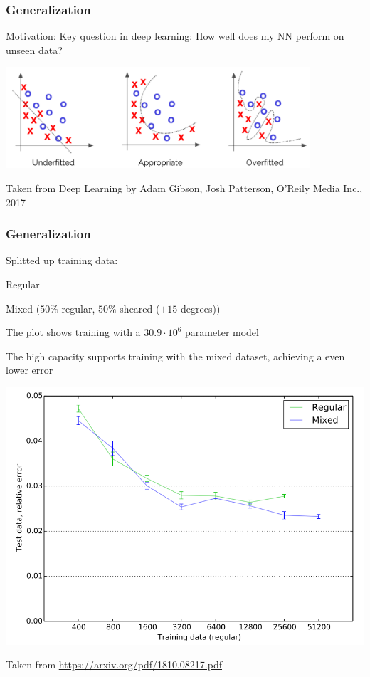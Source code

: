 \begin{frame}
    \frametitle{Generalization}
    \vspace*{0.8cm}
Motivation: Key question in deep learning: How well does my NN perform on unseen data?


\includegraphics[width=0.85\textwidth, height=.5\textheight]{./Ressourcen/Praesentation/Bilder/generalization.png}%

\vspace*{-0.6cm}

Taken from Deep Learning by Adam Gibson, Josh Patterson, O'Reily Media Inc., 2017

\end{frame}
\clearpage

\begin{frame}
    \frametitle{Generalization}
    \vspace*{0.8cm}
\begin{multicols}{2}
    Splitted up training data:
    \begin{PraesentationAufzaehlung}
		\item Regular
		\item Mixed ($50\%$ regular, $50\%$ sheared ($\pm 15$ degrees))
	\end{PraesentationAufzaehlung}
	
	The plot shows training with a $30.9 \cdot 10^6$ parameter model
	
	The high capacity supports training with the mixed dataset, \newline
	achieving a even lower error
	
	 
	
    \vfill\columnbreak
	\includegraphics[width=\columnwidth, height=.6\textheight]{./Ressourcen/Praesentation/Bilder/generaliz_plot.png}
\end{multicols}
\vspace*{-1.4cm}
    Taken from \url{https://arxiv.org/pdf/1810.08217.pdf}
\end{frame}
\clearpage

